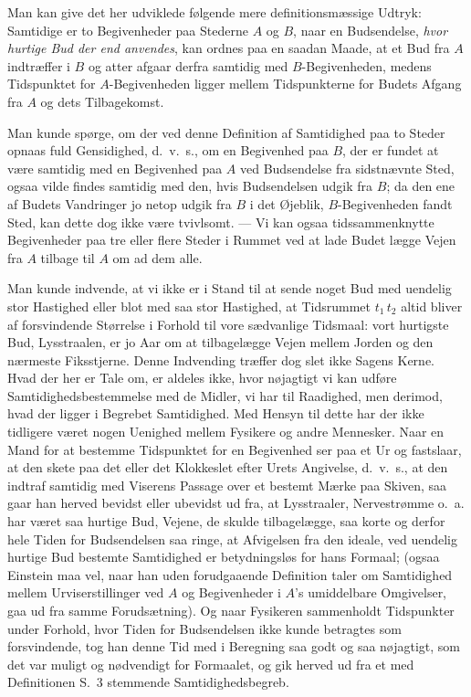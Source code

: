\documentclass[12pt,a4paper]{article}
\newcommand{\opage}[1]{\marginnote{\footnotesize\textit{[#1]}}}
\begin{document}
Man kan give det her udviklede følgende mere definitionsmæssige Udtryk:
Samtidige er to Begivenheder paa Stederne $A$ og $B$, naar en Budsendelse,
\emph{hvor hurtige Bud der end anvendes}, kan ordnes paa en saadan Maade, at et
Bud fra $A$ indtræffer i $B$ og atter afgaar derfra samtidig med
\guillemotleft $B$-Begivenheden\guillemotright, medens Tidspunktet for
\guillemotleft $A$-Begivenheden\guillemotright{} ligger mellem Tidspunkterne
for Budets Afgang fra $A$ og dets Tilbagekomst.

Man kunde spørge, om der ved denne Definition af Samtidighed paa to Steder
opnaas fuld Gensidighed, d.~v.~s., om en Begivenhed paa $B$, der er fundet at
være samtidig med en Begivenhed paa $A$ ved Budsendelse fra sidstnævnte Sted,
ogsaa vilde findes samtidig med den, hvis Budsendelsen udgik fra $B$; da den
ene af Budets Vandringer jo netop udgik fra $B$ i det Øjeblik,
$B$-Begivenheden fandt Sted, kan dette dog ikke være tvivlsomt. --- Vi kan
ogsaa tidssammenknytte Begivenheder paa tre eller flere Steder i Rummet ved at
lade Budet lægge Vejen fra $A$ tilbage til $A$ om ad dem alle.

Man kunde indvende, at vi ikke er i Stand til at sende noget Bud med uendelig
stor Hastighed eller blot med saa stor Hastighed, at Tidsrummet $t_{1}\,t_{2}$
altid bliver af forsvindende Størrelse i Forhold til vore sædvanlige Tidsmaal:
vort hurtigste Bud, Lysstraalen, er jo Aar om at tilbagelægge Vejen mellem
Jorden og den nærmeste Fiksstjerne. Denne Indvending træffer dog slet ikke
Sagens Kerne. Hvad der her er Tale om, er aldeles ikke, hvor nøjagtigt vi kan
udføre Samtidighedsbestemmelse med de Midler, vi har til Raadighed, men
derimod, hvad der ligger i Begrebet Samtidighed. Med Hensyn til dette har der
ikke tidligere været nogen Uenighed mellem Fysikere og andre Mennesker. Naar en
Mand for at bestemme Tidspunktet for en Begivenhed ser paa et Ur og fastslaar,
at den skete paa det eller det Klokkeslet efter Urets Angivelse, d.~v.~s., at
den indtraf samtidig med Viserens Passage over et bestemt Mærke paa Skiven, saa
gaar han herved bevidst eller ubevidst ud fra, at Lysstraaler, Nervestrømme
o.~a. har været saa hurtige Bud, Vejene, de skulde
\opage{4} tilbagelægge, saa korte og derfor hele Tiden for Budsendelsen saa ringe, at
Afvigelsen fra den ideale, ved uendelig hurtige Bud bestemte Samtidighed er
betydningsløs for hans Formaal; (ogsaa Einstein maa vel, naar han uden
forudgaaende Definition taler om Samtidighed mellem Urviserstillinger ved $A$
og Begivenheder i \guillemotleft $A$'s umiddelbare
Omgivelser\guillemotright, gaa ud fra samme Forudsætning). Og naar Fysikeren
sammenholdt Tidspunkter under Forhold, hvor Tiden for Budsendelsen ikke kunde
betragtes som forsvindende, tog han denne Tid med i Beregning saa godt og saa
nøjagtigt, som det var muligt og nødvendigt for Formaalet, og gik herved ud fra
et med Definitionen S.~3 stemmende Samtidighedsbegreb.
\end{document}
